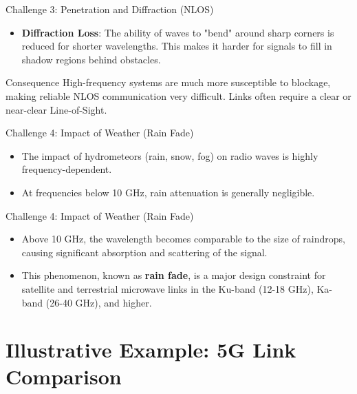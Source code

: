 \documentclass{beamer}
\begin{document}
	\begin{frame}{Challenge 3: Penetration and Diffraction (NLOS)}
		\begin{itemize}
			\item \textbf{Diffraction Loss}: The ability of waves to "bend" around sharp corners is reduced for shorter wavelengths. This makes it harder for signals to fill in shadow regions behind obstacles.
		\end{itemize}
		\begin{block}{Consequence}
			High-frequency systems are much more susceptible to blockage, making reliable NLOS communication very difficult. Links often require a clear or near-clear Line-of-Sight.
		\end{block}
	\end{frame}
	
	\begin{frame}{Challenge 4: Impact of Weather (Rain Fade)}
		\begin{itemize}
			\item The impact of hydrometeors (rain, snow, fog) on radio waves is highly frequency-dependent.
			\item At frequencies below 10 GHz, rain attenuation is generally negligible.
		\end{itemize}
	\end{frame}
	
	\begin{frame}{Challenge 4: Impact of Weather (Rain Fade)}
		\begin{itemize}
			\item Above 10 GHz, the wavelength becomes comparable to the size of raindrops, causing significant absorption and scattering of the signal.
			\item This phenomenon, known as \textbf{rain fade}, is a major design constraint for satellite and terrestrial microwave links in the Ku-band (12-18 GHz), Ka-band (26-40 GHz), and higher.
		\end{itemize}
	\end{frame}
	
	\section{Illustrative Example: 5G Link Comparison}
	
\end{document}
